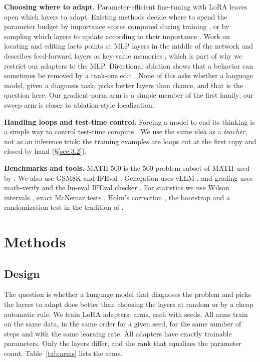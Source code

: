 \documentclass[11pt]{article}
\begin{document}
\textbf{Choosing where to adapt.} Parameter-efficient fine-tuning with LoRA \citep{hu2022} leaves open which layers to adapt. Existing methods decide where to spend the parameter budget by importance scores computed during training \citep{zhang2023adalora}, or by sampling which layers to update according to their importance \citep{pan2024lisa}. Work on locating and editing facts points at MLP layers in the middle of the network \citep{meng2022rome} and describes feed-forward layers as key-value memories \citep{geva2021ffn}, which is part of why we restrict our adapters to the MLP. Directional ablation shows that a behavior can sometimes be removed by a rank-one edit \citep{arditi2024}. None of this asks whether a language model, given a diagnosis task, picks better layers than chance, and that is the question here. Our gradient-norm arm is a simple member of the first family; our sweep arm is closer to ablation-style localization.

\textbf{Handling loops and test-time control.} Forcing a model to end its thinking is a simple way to control test-time compute \citep{muennighoff2025}. We use the same idea as a \emph{teacher}, not as an inference trick: the training examples are loops cut at the first copy and closed by hand (\S\ref{sec:3.2}).

\textbf{Benchmarks and tools.} MATH-500 is the 500-problem subset of MATH \citep{hendrycks2021} used by \citet{lightman2023}. We also use GSM8K \citep{cobbe2021} and IFEval \citep{zhou2023}. Generation uses vLLM \citep{kwon2023}, and grading uses math-verify \citep{mathverify} and the lm-eval IFEval checker \citep{lmeval}. For statistics we use Wilson intervals \citep{wilson1927}, exact McNemar tests \citep{mcnemar1947}, Holm's correction \citep{holm1979}, the bootstrap \citep{efron1979} and a randomization test in the tradition of \citet{fisher1935}.

\section{Methods}\label{sec:3}

\subsection{Design}\label{sec:3.1}

The question is whether a language model that diagnoses the problem and picks the layers to adapt does better than choosing the layers at random or by a cheap automatic rule. We train \NLora{} LoRA adapters: \NArms{} arms, each with \NSeeds{} seeds. All arms train on the same data, in the same order for a given seed, for the same number of steps and with the same learning rate. All adapters have exactly \ParamsLora{} trainable parameters. Only the layers differ, and the rank that equalizes the parameter count. Table~\ref{tab:arms} lists the arms.
\end{document}
